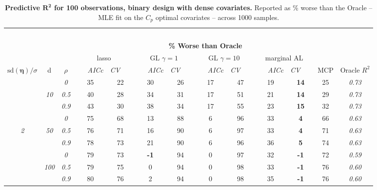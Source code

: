 
\clearpage
\begin{table}
\vspace{-.2cm}
\footnotesize
\caption{ 
	{\bf  Predictive $\boldsymbol{R^2}$ for 100 observations, 
	binary design with dense covariates.}
  Reported as  \% worse than the Oracle 
  -- MLE fit on the $C_p$ optimal covariates -- 
  across 1000 samples.}
\begin{center}
\begin{tabular}{ccc|cc|cc|cc|cc|c|c}
\hline &&&\multicolumn{9}{|c|}{~}\\[-1ex]
\multicolumn{3}{c}{~}&\multicolumn{9}{|c|}{\bf \% Worse than Oracle } &   \\[1ex]
& &
& \multicolumn{2}{c}{lasso} 
& \multicolumn{2}{c}{GL $\gamma=1$} 
& \multicolumn{2}{c}{GL $\gamma=10$} 
& \multicolumn{2}{c}{marginal AL} 
& \multicolumn{1}{c|}{~} & \\[-0.5ex]
$\mathrm{sd}(\boldsymbol{\eta})/\sigma$ & {\sf d} & $\rho$ 
& ~~~\scriptsize\it AICc & \multicolumn{1}{c}{\scriptsize\it CV~~~}
& ~~~\scriptsize\it AICc & \multicolumn{1}{c}{\scriptsize\it CV~~~}
& ~~~\scriptsize\it AICc & \multicolumn{1}{c}{\scriptsize\it CV~~~}
& ~~~\scriptsize\it AICc & \multicolumn{1}{c}{\scriptsize\it CV~~~} 
& \multicolumn{1}{c|}{ MCP} & Oracle $R^2$ \\[.5ex]
\hline\rule{0pt}{3ex}
& & \it  0  & 35 & 22 & 30 & 26 & 17 & 47 & 19 & {\bf 14} & 25 & \it  0.73 \\
 & \it  10  & \it  0.5  & 40 & 28 & 34 & 31 & 17 & 51 & 21 & {\bf 14} & 29 & \it  0.73 \\
& & \it  0.9  & 43 & 30 & 38 & 34 & 17 & 55 & 23 & {\bf 15} & 32 & \it  0.73 \\[1ex]
\cline{2-3}\rule{0pt}{3ex}
& & \it  0  & 75 & 68 & 13 & 88 & 6 & 96 & 33 & {\bf 4} & 66 & \it  0.63 \\
\it  2  & \it  50  & \it  0.5  & 76 & 71 & 16 & 90 & 6 & 97 & 33 & {\bf 4} & 71 & \it  0.63 \\
& & \it  0.9  & 78 & 73 & 21 & 90 & 6 & 96 & 36 & {\bf 5} & 74 & \it  0.63 \\[1ex]
\cline{2-3}\rule{0pt}{3ex}
& & \it  0  & 79 & 73 & {\bf -1} & 94 & 0 & 97 & 32 & {\bf -1} & 72 & \it  0.59 \\
 & \it  100  & \it  0.5  & 79 & 75 & 0 & 94 & 0 & 98 & 33 & {\bf -1} & 76 & \it  0.60 \\
& & \it  0.9  & 80 & 76 & 2 & 94 & 0 & 98 & 35 & {\bf -1} & 76 & \it  0.60 \\[1ex]

\end{tabular}
\end{center}
\end{table}
